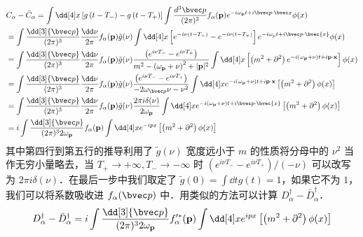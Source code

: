 \begin{equation} \begin{aligned}
&C_\alpha-\bar{C}_\alpha=\int \dd[4] x\left[g\left(t-T_{-}\right)-g\left(t-T_{+}\right)\right] \int \frac{d^3 {\bvec p}}{(2 \pi)^3} f_\alpha(\mathbf{p}) e^{-i \omega_{\mathbf{p}} t+i \bvec p \cdot \bvec x} \phi(x)\\
&=\int \frac{\dd[3]{\bvec p}}{(2 \pi)^3} \frac{\dd \nu}{2 \pi} f_\alpha(\mathbf{p}) \tilde{g}(\nu) \int \dd[4] x\left[e^{-i \nu\left(t-T_{-}\right)}-e^{-i \nu\left(t-T_{+}\right)}\right] e^{-i \omega_{\mathrm{p}} t+i \bvec p \cdot \bvec{x}} \phi(x)\\
&=\int \frac{\dd[3]{\bvec p}}{(2 \pi)^3} \frac{\dd \nu}{2 \pi} f_\alpha(\mathbf{p}) \tilde{g}(\nu) \frac{\left(e^{i \nu T_{-}}-e^{i \nu T_{+}}\right)}{m^2-\left(\omega_{\mathbf{p}}+\nu\right)^2+|\mathbf{p}|^2} \int \dd[4] x\left[\left(m^2+\partial^2\right) e^{-i\left(\omega_{\mathbf{p}}+\nu\right) t+i \mathbf{p} \cdot \mathbf{x}}\right] \phi(x)\\
&=\int \frac{\dd[3]{\bvec p}}{(2 \pi)^3} \frac{\dd \nu}{2 \pi} f_\alpha(\mathbf{p}) \tilde{g}(\nu) \frac{\left(e^{i \nu T_{-}}-e^{i\nu T_{+}}\right)}{-2\omega_{\bvec p}\nu - \nu^2} \int \dd[4] x e^{-i\left(\omega_{\mathbf{p}}+\nu\right) t+i \mathbf{p} \cdot \mathbf{x}}\left[\left(m^2+\partial^2\right) \phi(x)\right]\\
&=\int \frac{\dd[3]{\bvec p}}{(2 \pi)^3} \frac{\dd \nu}{2 \pi} f_\alpha(\mathbf{p}) \tilde{g}(\nu) \frac{2 \pi i \delta(\nu)}{2 \omega_{\mathbf{p}}} \int \dd[4] x e^{-i\left(\omega_{\mathbf{p}}+\nu\right) t+i \bvec p \cdot \bvec{x}}\left[\left(m^2+\partial^2\right) \phi(x)\right]\\
&=i \int \frac{\dd[3]{\bvec p}}{(2 \pi)^3 2 \omega_{\mathbf{p}}} f_\alpha(\mathbf{p}) \int \dd[4]x e^{-ipx}\left[\left(m^2+\partial^2\right) \phi(x)\right]
\end{aligned}\end{equation}
其中第四行到第五行的推导利用了 $\tilde{g}(\nu)$ 宽度远小于 $m$ 的性质将分母中的 $\nu^2$ 当作无穷小量略去，当 $T_+\rightarrow +\infty,T_-\rightarrow -\infty$ 时 $(e^{i\nu T_-}-e^{i\nu T_+})/(-\nu)$ 可以改写为 $2\pi i\delta(\nu)$．在最后一步中我们取定了 $\tilde g(0)=\int \dd{t} g(t)=1$，如果它不为 $1$，我们可以将系数吸收进 $f_\alpha(\bvec p)$ 中．用类似的方法可以计算 $D_\alpha^\dagger-\bar{D}_\alpha^\dagger$．
\[
D_\alpha^\dagger-\bar{D}_\alpha^\dagger=i \int \frac{\dd[3]{\bvec p}}{(2 \pi)^3 2 \omega_{\mathbf{p}}} f'^{*}_\alpha(\mathbf{p}) \int \dd[4]x e^{ipx}\left[\left(m^2+\partial^2\right) \phi(x)\right]
\]

